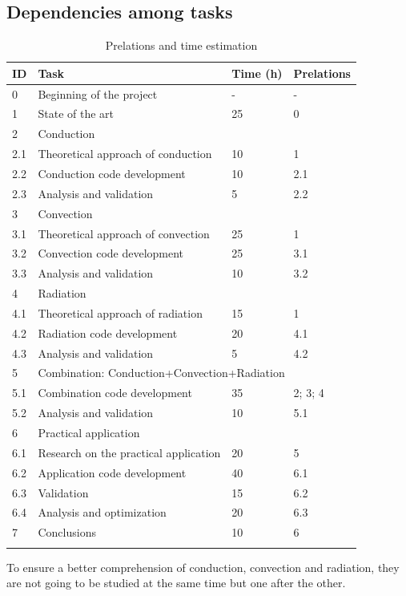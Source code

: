 \subsection{Dependencies among tasks}
\begin{longtable}{ | p{1.3cm} | p{7cm} | p{3cm} | p{3.5cm} |}
\hline

\textbf{ID }& \textbf{Task} & \textbf{Time (h)} & \textbf{Prelations} \\ \hline
0 & Beginning of the project & - & -  \\ \hline
1 & State of the art & 25 & 0 \\ \hline
2 & \multicolumn{3}{|l|}{Conduction} \\ \hline
2.1 & Theoretical approach of conduction & 10 & 1 \\ \hline
2.2 & Conduction code development & 10 & 2.1 \\ \hline
2.3 & Analysis and validation & 5 & 2.2 \\ \hline
3 & \multicolumn{3}{|l|}{Convection} \\ \hline
3.1 & Theoretical approach of convection & 25 & 1 \\ \hline
3.2 & Convection code development & 25 & 3.1 \\ \hline
3.3 & Analysis and validation & 10 & 3.2 \\ \hline
4 & \multicolumn{3}{|l|}{Radiation} \\ \hline
4.1 & Theoretical approach of radiation & 15 & 1 \\ \hline
4.2 & Radiation code development & 20 & 4.1 \\ \hline
4.3 & Analysis and validation & 5 & 4.2 \\ \hline
5 & \multicolumn{3}{|l|}{Combination: Conduction+Convection+Radiation} \\ \hline
5.1 & Combination code development & 35 & 2; 3; 4 \\ \hline
5.2 & Analysis and validation & 10 & 5.1 \\ \hline
6 & \multicolumn{3}{|l|}{Practical application} \\ \hline
6.1 & Research on the practical application & 20 & 5 \\ \hline
6.2 & Application code development & 40 & 6.1  \\ \hline
6.3 & Validation & 15 & 6.2 \\ \hline
6.4 & Analysis and optimization  & 20 & 6.3 \\ \hline
7 & Conclusions & 10 & 6 \\ \hline
\caption{Prelations and time estimation} \\
\end{longtable}
To ensure a better comprehension of conduction, convection and radiation, they are not going to be studied at the same time but one after the other. 

